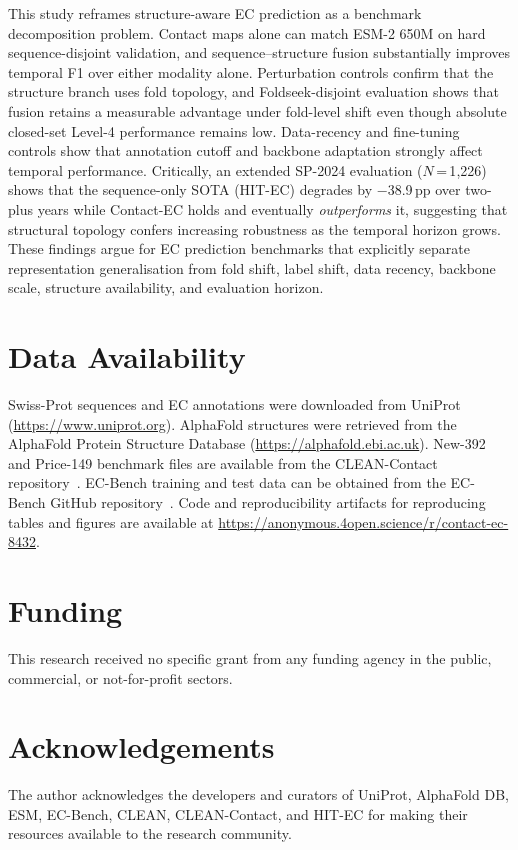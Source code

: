 \documentclass[namedate,contemporary,mediumone]{oup-authoring-template}
\begin{document}
This study reframes structure-aware EC prediction as a benchmark decomposition
problem. Contact maps alone can match ESM-2 650M on hard sequence-disjoint
validation, and sequence--structure fusion substantially improves temporal F1 over
either modality alone. Perturbation controls confirm that the structure branch uses
fold topology, and Foldseek-disjoint evaluation shows that fusion retains a
measurable advantage under fold-level shift even though absolute closed-set
Level-4 performance remains low. Data-recency and fine-tuning controls show that annotation
cutoff and backbone adaptation strongly affect temporal performance. Critically,
an extended SP-2024 evaluation ($N$\,=\,1{,}226) shows that the sequence-only
SOTA (HIT-EC) degrades by $-$38.9\,pp over two-plus years while Contact-EC
holds and eventually \emph{outperforms} it, suggesting that structural topology
confers increasing robustness as the temporal horizon grows. These findings
argue for EC prediction benchmarks that explicitly separate representation
generalisation from fold shift, label shift, data recency, backbone scale,
structure availability, and evaluation horizon.

\section*{Data Availability}

Swiss-Prot sequences and EC annotations were downloaded from
UniProt~\citep{uniprot2023} (\url{https://www.uniprot.org}). AlphaFold structures were retrieved from the
AlphaFold Protein Structure Database (\url{https://alphafold.ebi.ac.uk}).
New-392 and Price-149 benchmark files are available from the CLEAN-Contact
repository~\citep{ayres2024}. EC-Bench training and test data can be obtained from the EC-Bench
GitHub repository~\citep{davoudi2026}. Code and reproducibility artifacts for reproducing tables
and figures are available at \url{https://anonymous.4open.science/r/contact-ec-8432}.

\section*{Funding}
This research received no specific grant from any funding agency in the public,
commercial, or not-for-profit sectors.

\section*{Acknowledgements}
The author acknowledges the developers and curators of UniProt, AlphaFold DB,
ESM, EC-Bench, CLEAN, CLEAN-Contact, and HIT-EC for making their resources
available to the research community.
\end{document}
